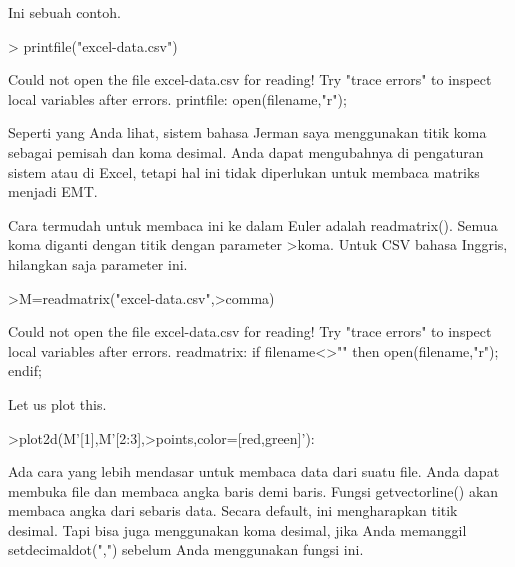 \documentclass[a4paper,10pt]{article}
\begin{document}
\begin{eulernotebook}
\begin{eulercomment}
\begin{eulercomment}
\begin{eulercomment}
\begin{eulercomment}
\begin{eulercomment}
\begin{eulercomment}
\begin{eulercomment}
\begin{eulercomment}
\begin{eulercomment}
\begin{eulercomment}
\begin{eulercomment}
\begin{eulercomment}
\begin{eulercomment}
\begin{eulercomment}
\begin{eulercomment}
\begin{eulercomment}
\begin{eulercomment}
Ini sebuah contoh.
\end{eulercomment}
\begin{eulerprompt}
> printfile("excel-data.csv")
\end{eulerprompt}
\begin{euleroutput}
  Could not open the file
  excel-data.csv
  for reading!
  Try "trace errors" to inspect local variables after errors.
  printfile:
      open(filename,"r");
\end{euleroutput}
\begin{eulercomment}
Seperti yang Anda lihat, sistem bahasa Jerman saya menggunakan titik
koma sebagai pemisah dan koma desimal. Anda dapat mengubahnya di
pengaturan sistem atau di Excel, tetapi hal ini tidak diperlukan untuk
membaca matriks menjadi EMT.

Cara termudah untuk membaca ini ke dalam Euler adalah readmatrix().
Semua koma diganti dengan titik dengan parameter \textgreater{}koma. Untuk CSV
bahasa Inggris, hilangkan saja parameter ini.
\end{eulercomment}
\begin{eulerprompt}
>M=readmatrix("excel-data.csv",>comma)
\end{eulerprompt}
\begin{euleroutput}
  Could not open the file
  excel-data.csv
  for reading!
  Try "trace errors" to inspect local variables after errors.
  readmatrix:
      if filename<>"" then open(filename,"r"); endif;
\end{euleroutput}
\begin{eulercomment}
Let us plot this.
\end{eulercomment}
\begin{eulerprompt}
>plot2d(M'[1],M'[2:3],>points,color=[red,green]'):
\end{eulerprompt}
\begin{eulercomment}
Ada cara yang lebih mendasar untuk membaca data dari suatu file. Anda
dapat membuka file dan membaca angka baris demi baris. Fungsi
getvectorline() akan membaca angka dari sebaris data. Secara default,
ini mengharapkan titik desimal. Tapi bisa juga menggunakan koma
desimal, jika Anda memanggil setdecimaldot(",") sebelum Anda
menggunakan fungsi ini.


\end{eulercomment}
\end{eulercomment}
\end{eulercomment}
\end{eulercomment}
\end{eulercomment}
\end{eulercomment}
\end{eulercomment}
\end{eulercomment}
\end{eulercomment}
\end{eulercomment}
\end{eulercomment}
\end{eulercomment}
\end{eulercomment}
\end{eulercomment}
\end{eulercomment}
\end{eulercomment}
\end{eulercomment}
\end{eulernotebook}
\end{document}
